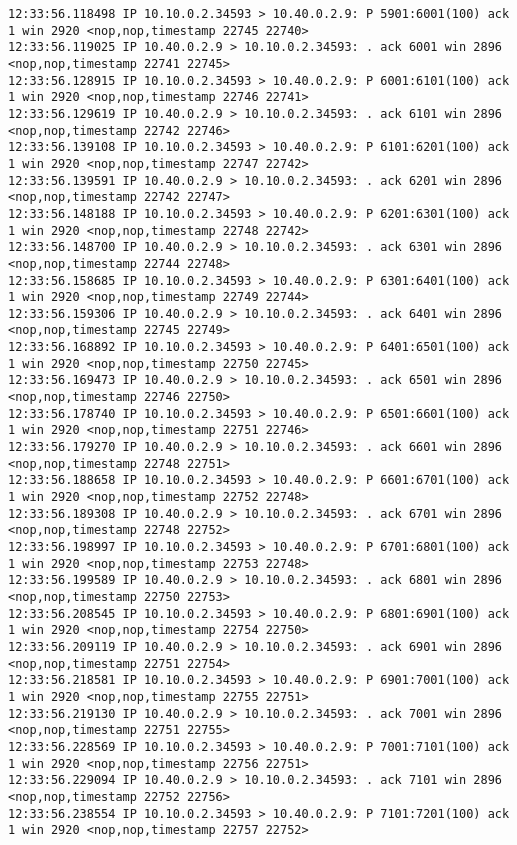 \documentclass[a4paper,12pt]{article}
\begin{document}
\begin{lstlisting}
12:33:56.118498 IP 10.10.0.2.34593 > 10.40.0.2.9: P 5901:6001(100) ack 1 win 2920 <nop,nop,timestamp 22745 22740>
12:33:56.119025 IP 10.40.0.2.9 > 10.10.0.2.34593: . ack 6001 win 2896 <nop,nop,timestamp 22741 22745>
12:33:56.128915 IP 10.10.0.2.34593 > 10.40.0.2.9: P 6001:6101(100) ack 1 win 2920 <nop,nop,timestamp 22746 22741>
12:33:56.129619 IP 10.40.0.2.9 > 10.10.0.2.34593: . ack 6101 win 2896 <nop,nop,timestamp 22742 22746>
12:33:56.139108 IP 10.10.0.2.34593 > 10.40.0.2.9: P 6101:6201(100) ack 1 win 2920 <nop,nop,timestamp 22747 22742>
12:33:56.139591 IP 10.40.0.2.9 > 10.10.0.2.34593: . ack 6201 win 2896 <nop,nop,timestamp 22742 22747>
12:33:56.148188 IP 10.10.0.2.34593 > 10.40.0.2.9: P 6201:6301(100) ack 1 win 2920 <nop,nop,timestamp 22748 22742>
12:33:56.148700 IP 10.40.0.2.9 > 10.10.0.2.34593: . ack 6301 win 2896 <nop,nop,timestamp 22744 22748>
12:33:56.158685 IP 10.10.0.2.34593 > 10.40.0.2.9: P 6301:6401(100) ack 1 win 2920 <nop,nop,timestamp 22749 22744>
12:33:56.159306 IP 10.40.0.2.9 > 10.10.0.2.34593: . ack 6401 win 2896 <nop,nop,timestamp 22745 22749>
12:33:56.168892 IP 10.10.0.2.34593 > 10.40.0.2.9: P 6401:6501(100) ack 1 win 2920 <nop,nop,timestamp 22750 22745>
12:33:56.169473 IP 10.40.0.2.9 > 10.10.0.2.34593: . ack 6501 win 2896 <nop,nop,timestamp 22746 22750>
12:33:56.178740 IP 10.10.0.2.34593 > 10.40.0.2.9: P 6501:6601(100) ack 1 win 2920 <nop,nop,timestamp 22751 22746>
12:33:56.179270 IP 10.40.0.2.9 > 10.10.0.2.34593: . ack 6601 win 2896 <nop,nop,timestamp 22748 22751>
12:33:56.188658 IP 10.10.0.2.34593 > 10.40.0.2.9: P 6601:6701(100) ack 1 win 2920 <nop,nop,timestamp 22752 22748>
12:33:56.189308 IP 10.40.0.2.9 > 10.10.0.2.34593: . ack 6701 win 2896 <nop,nop,timestamp 22748 22752>
12:33:56.198997 IP 10.10.0.2.34593 > 10.40.0.2.9: P 6701:6801(100) ack 1 win 2920 <nop,nop,timestamp 22753 22748>
12:33:56.199589 IP 10.40.0.2.9 > 10.10.0.2.34593: . ack 6801 win 2896 <nop,nop,timestamp 22750 22753>
12:33:56.208545 IP 10.10.0.2.34593 > 10.40.0.2.9: P 6801:6901(100) ack 1 win 2920 <nop,nop,timestamp 22754 22750>
12:33:56.209119 IP 10.40.0.2.9 > 10.10.0.2.34593: . ack 6901 win 2896 <nop,nop,timestamp 22751 22754>
12:33:56.218581 IP 10.10.0.2.34593 > 10.40.0.2.9: P 6901:7001(100) ack 1 win 2920 <nop,nop,timestamp 22755 22751>
12:33:56.219130 IP 10.40.0.2.9 > 10.10.0.2.34593: . ack 7001 win 2896 <nop,nop,timestamp 22751 22755>
12:33:56.228569 IP 10.10.0.2.34593 > 10.40.0.2.9: P 7001:7101(100) ack 1 win 2920 <nop,nop,timestamp 22756 22751>
12:33:56.229094 IP 10.40.0.2.9 > 10.10.0.2.34593: . ack 7101 win 2896 <nop,nop,timestamp 22752 22756>
12:33:56.238554 IP 10.10.0.2.34593 > 10.40.0.2.9: P 7101:7201(100) ack 1 win 2920 <nop,nop,timestamp 22757 22752>

\end{lstlisting}
\end{document}
